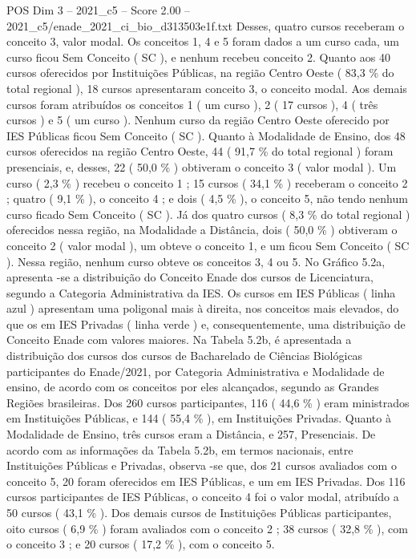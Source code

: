 \begin{textsample}{POS Dim 3 – 2021\_c5 – Score 2.00 – 2021\_c5/enade\_2021\_ci\_bio\_d313503e1f.txt}
Desses, quatro cursos receberam o conceito 3, valor modal.
Os conceitos 1, 4 e 5 foram dados a um curso cada, um curso ficou Sem Conceito ( SC ), e nenhum recebeu conceito 2.
Quanto aos 40 cursos oferecidos por Instituições Públicas, na região Centro Oeste ( 83,3 \% do total regional ), 18 cursos apresentaram conceito 3, o conceito modal.
Aos demais cursos foram atribuídos os conceitos 1 ( um curso ), 2 ( 17 cursos ), 4 ( três cursos ) e 5 ( um curso ).
Nenhum curso da região Centro Oeste oferecido por IES Públicas ficou Sem Conceito ( SC ).
Quanto à Modalidade de Ensino, dos 48 cursos oferecidos na região Centro Oeste, 44 ( 91,7 \% do total regional ) foram presenciais, e, desses, 22 ( 50,0 \% ) obtiveram o conceito 3 ( valor modal ).
Um curso ( 2,3 \% ) recebeu o conceito 1 ; 15 cursos ( 34,1 \% ) receberam o conceito 2 ; quatro ( 9,1 \% ), o conceito 4 ; e dois ( 4,5 \% ), o conceito 5, não tendo nenhum curso ficado Sem Conceito ( SC ).
Já dos quatro cursos ( 8,3 \% do total regional ) oferecidos nessa região, na Modalidade a Distância, dois ( 50,0 \% ) obtiveram o conceito 2 ( valor modal ), um obteve o conceito 1, e um ficou Sem Conceito ( SC ).
Nessa região, nenhum curso obteve os conceitos 3, 4 ou 5.
No Gráfico 5.2a, apresenta -se a distribuição do Conceito Enade dos cursos de Licenciatura, segundo a Categoria Administrativa da IES.
Os cursos em IES Públicas ( linha azul ) apresentam uma poligonal mais à direita, nos conceitos mais elevados, do que os em IES Privadas ( linha verde ) e, consequentemente, uma distribuição de Conceito Enade com valores maiores.
Na Tabela 5.2b, é apresentada a distribuição dos cursos dos cursos de Bacharelado de Ciências Biológicas participantes do Enade/2021, por Categoria Administrativa e Modalidade de ensino, de acordo com os conceitos por eles alcançados, segundo as Grandes Regiões brasileiras.
Dos 260 cursos participantes, 116 ( 44,6 \% ) eram ministrados em Instituições Públicas, e 144 ( 55,4 \% ), em Instituições Privadas.
Quanto à Modalidade de Ensino, três cursos eram a Distância, e 257, Presenciais.
De acordo com as informações da Tabela 5.2b, em termos nacionais, entre Instituições Públicas e Privadas, observa -se que, dos 21 cursos avaliados com o conceito 5, 20 foram oferecidos em IES Públicas, e um em IES Privadas.
Dos 116 cursos participantes de IES Públicas, o conceito 4 foi o valor modal, atribuído a 50 cursos ( 43,1 \% ).
Dos demais cursos de Instituições Públicas participantes, oito cursos ( 6,9 \% ) foram avaliados com o conceito 2 ; 38 cursos ( 32,8 \% ), com o conceito 3 ; e 20 cursos ( 17,2 \% ), com o conceito 5.

\end{textsample}
